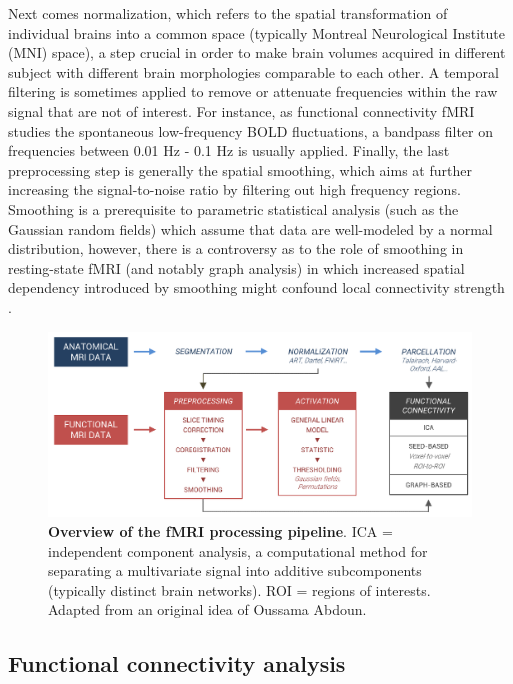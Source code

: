 Next comes normalization, which refers to the spatial transformation of individual brains into a common space (typically Montreal Neurological Institute (MNI) space), a step crucial in order to make brain volumes acquired in different subject with different brain morphologies comparable to each other. A temporal filtering is sometimes applied to remove or attenuate frequencies within the raw signal that are not of interest. For instance, as functional connectivity fMRI studies the spontaneous low-frequency BOLD fluctuations, a bandpass filter on frequencies between 0.01 Hz - 0.1 Hz is usually applied. Finally, the last preprocessing step is generally the spatial smoothing, which aims at further increasing the signal-to-noise ratio by filtering out high frequency regions. Smoothing is a prerequisite to parametric statistical analysis (such as the Gaussian random fields) which assume that data are well-modeled by a normal distribution, however, there is a controversy as to the role of smoothing in resting-state fMRI (and notably graph analysis) in which increased spatial dependency introduced by smoothing might confound local connectivity strength \citep{hayasaka_comparison_2010}.

\begin{figure}[htb]
	\includegraphics[width=\textwidth]{Fig/Methods/fMRI_pipeline/fMRI_pipeline_perso.png}
	\caption[Overview of the fMRI processing pipeline]{\textbf{Overview of the fMRI processing pipeline}. ICA = independent component analysis, a computational method for separating a multivariate signal into additive subcomponents (typically distinct brain networks). ROI = regions of interests. Adapted from an original idea of Oussama Abdoun.}
	\label{fig:methods:fmri-pipeline}
\end{figure}

\subsection{Functional connectivity analysis}
\label{sec:fmri:rs:analysis}

